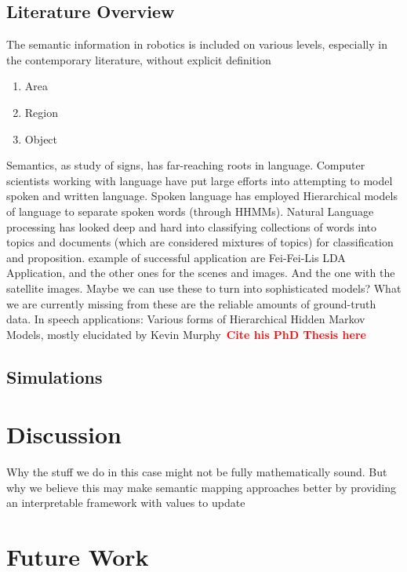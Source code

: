 \documentclass[twocolumn,letterpaper]{IEEEAerospaceCLS}  %
\newcommand\todo[1]{\textbf{\textcolor{red}{#1}}}
\begin{document}
\subsection{Literature Overview}
The semantic information in robotics is included on various levels, especially in the contemporary literature, without explicit definition
\begin{enumerate}
    \item Area
    \item Region
    \item Object
\end{enumerate}
Semantics, as study of signs, has far-reaching roots in language. Computer scientists working with language have put large efforts into attempting to model spoken and written language. Spoken language has employed Hierarchical models of language to separate spoken words (through HHMMs). Natural Language processing has looked deep and hard into classifying collections of words into topics and documents (which are considered mixtures of topics) for classification and proposition. 
example of successful application are Fei-Fei-Lis LDA Application, and the other ones for the scenes and images. And the one with the satellite images. Maybe we can use these to turn into sophisticated models?
What we are currently missing from these are the reliable amounts of ground-truth data.
In speech applications: Various forms of Hierarchical Hidden Markov Models, mostly elucidated by Kevin Murphy~\todo{Cite his PhD Thesis here}
\subsection{Simulations}

\section{Discussion} \label{sec:Disc}
Why the stuff we do in this case might not be fully mathematically sound. But why we believe this may make semantic mapping approaches better by providing an interpretable framework with values to update 
\section{Future Work} \label{sec:Fut}
\appendices{}              %
\end{document}
